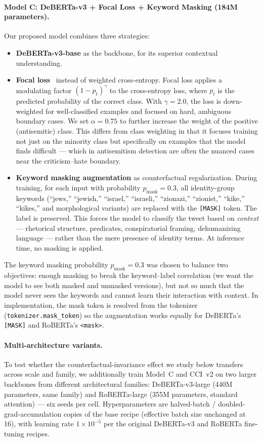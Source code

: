 \documentclass[10pt,a4paper]{article}
\begin{document}
\paragraph{Model C: DeBERTa-v3 + Focal Loss + Keyword Masking (184M parameters).}
Our proposed model combines three strategies:
\begin{itemize}[leftmargin=*,itemsep=2pt]
    \item \textbf{DeBERTa-v3-base} as the backbone, for its superior contextual understanding.
    \item \textbf{Focal loss}~\citep{lin2017focal} instead of weighted cross-entropy. Focal loss applies a modulating factor $(1 - p_t)^\gamma$ to the cross-entropy loss, where $p_t$ is the predicted probability of the correct class. With $\gamma = 2.0$, the loss is down-weighted for well-classified examples and focused on hard, ambiguous boundary cases. We set $\alpha = 0.75$ to further increase the weight of the positive (antisemitic) class. This differs from class weighting in that it focuses training not just on the minority class but specifically on examples that the model finds difficult --- which in antisemitism detection are often the nuanced cases near the criticism--hate boundary.
    \item \textbf{Keyword masking augmentation} as counterfactual regularization. During training, for each input with probability $p_{\text{mask}} = 0.3$, all identity-group keywords (``jews,'' ``jewish,'' ``israel,'' ``israeli,'' ``zionazi,'' ``zionist,'' ``kike,'' ``kikes,'' and morphological variants) are replaced with the \texttt{[MASK]} token. The label is preserved. This forces the model to classify the tweet based on \emph{context} --- rhetorical structure, predicates, conspiratorial framing, dehumanizing language --- rather than the mere presence of identity terms. At inference time, no masking is applied.
\end{itemize}

The keyword masking probability $p_{\text{mask}} = 0.3$ was chosen to balance two objectives: enough masking to break the keyword--label correlation (we want the model to see both masked and unmasked versions), but not so much that the model never sees the keywords and cannot learn their interaction with context. In implementation, the mask token is resolved from the tokenizer (\texttt{tokenizer.mask\_token}) so the augmentation works equally for DeBERTa's \texttt{[MASK]} and RoBERTa's \texttt{<mask>}.

\paragraph{Multi-architecture variants.}
To test whether the counterfactual-invariance effect we study below transfers across scale and family, we additionally train Model~C and CCI~v2 on two larger backbones from different architectural families: DeBERTa-v3-large (440M parameters, same family) and RoBERTa-large (355M parameters, standard attention) --- six seeds per cell. Hyperparameters are halved-batch / doubled-grad-accumulation copies of the base recipe (effective batch size unchanged at 16), with learning rate $1 \times 10^{-5}$ per the original DeBERTa-v3 and RoBERTa fine-tuning recipes.
\end{document}
